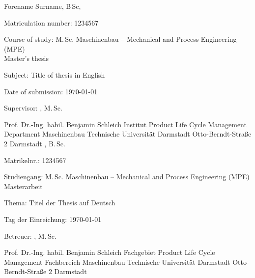 \documentclass[
	thesis={type=msc}, %
	class=report,%
	ruledheaders=section,%
	accentcolor=1b, %
	marginpar=false,%
	parskip=half-,%
	fontsize=11pt,%
	IMRAD=false, %
]{tudapub}
\begin{document}





\ifdocenglish
    Forename Surname, B\,Sc, 
    
    Matriculation number: 1234567
    
    Course of study: M.\,Sc. Maschinenbau – Mechanical and Process Engineering (MPE) 
    \\
    Master's thesis 
    
   Subject: Title of thesis in English
    
    Date of submission: \today %
    
    Supervisor: \SADABetreuer, M.\,Sc. 
    
    \singlespacing %
    Prof. Dr.-Ing. habil. Benjamin Schleich
    \newline Institut Product Life Cycle Management
    \newline Department Maschinenbau 
    \newline Technische Universität Darmstadt 
    \newline Otto-Berndt-Straße 2 
     Darmstadt
\else
    \NameA , B.\,Sc.

    Matrikelnr.: 1234567
    
    Studiengang: M.\,Sc. Maschinenbau – Mechanical and Process Engineering (MPE) 
    \\
    Masterarbeit 
    
    Thema: Titel der Thesis auf Deutsch
    
    Tag der Einreichung: \today %
    
    Betreuer: \SADABetreuer, M.\,Sc. 
    
    \singlespacing %
    Prof. Dr.-Ing. habil. Benjamin Schleich
    \newline Fachgebiet Product Life Cycle Management
    \newline Fachbereich Maschinenbau 
    \newline Technische Universität Darmstadt 
    \newline Otto-Berndt-Straße 2 
     Darmstadt
\fi 
\end{document}
